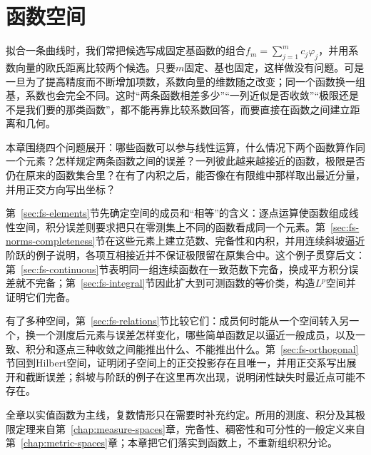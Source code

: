 \chapter{函数空间}
\label{chap:function-spaces}
\label{chap:functional-analysis-and-approximation}

拟合一条曲线时，我们常把候选写成固定基函数的组合$f_m=\sum_{j=1}^mc_j\varphi_j$，并用系数向量的欧氏距离比较两个候选。只要$m$固定、基也固定，这样做没有问题。可是一旦为了提高精度而不断增加项数，系数向量的维数随之改变；同一个函数换一组基，系数也会完全不同。这时“两条函数相差多少”“一列近似是否收敛”“极限还是不是我们要的那类函数”，都不能再靠比较系数回答，而要直接在函数之间建立距离和几何。

本章围绕四个问题展开：哪些函数可以参与线性运算，什么情况下两个函数算作同一个元素？怎样规定两条函数之间的误差？一列彼此越来越接近的函数，极限是否仍在原来的函数集合里？在有了内积之后，能否像在有限维中那样取出最近分量，并用正交方向写出坐标？

第~\ref{sec:fs-elements}节先确定空间的成员和“相等”的含义：逐点运算使函数组成线性空间，积分误差则要求把只在零测集上不同的函数看成同一个元素。第~\ref{sec:fs-norms-completeness}节在这些元素上建立范数、完备性和内积，并用连续斜坡逼近阶跃的例子说明，各项互相接近并不保证极限留在原集合中。这个例子贯穿后文：第~\ref{sec:fs-continuous}节表明同一组连续函数在一致范数下完备，换成平方积分误差就不完备；第~\ref{sec:fs-integral}节因此扩大到可测函数的等价类，构造$L^p$空间并证明它们完备。

有了多种空间，第~\ref{sec:fs-relations}节比较它们：成员何时能从一个空间转入另一个，换一个测度后元素与误差怎样变化，哪些简单函数足以逼近一般成员，以及一致、积分和逐点三种收敛之间能推出什么、不能推出什么。第~\ref{sec:fs-orthogonal}节回到Hilbert空间，证明闭子空间上的正交投影存在且唯一，并用正交系写出展开和截断误差；斜坡与阶跃的例子在这里再次出现，说明闭性缺失时最近点可能不存在。

全章以实值函数为主线，复数情形只在需要时补充约定。所用的测度、积分及其极限定理来自第~\ref{chap:measure-spaces}章，完备性、稠密性和可分性的一般定义来自第~\ref{chap:metric-spaces}章；本章把它们落实到函数上，不重新组织积分论。








